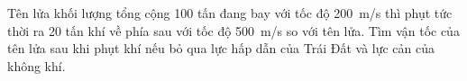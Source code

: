 \begin{vd}
	Tên lửa khối lượng tổng cộng 100 tấn đang bay với tốc độ \SI{200}{\meter/\second} thì phụt tức thời ra 20 tấn khí về phía sau với tốc độ \SI{500}{\meter/\second} so với tên lửa. Tìm vận tốc của tên lửa sau khi phụt khí nếu bỏ qua lực hấp dẫn của Trái Đất và lực cản của không khí.
\end{vd}